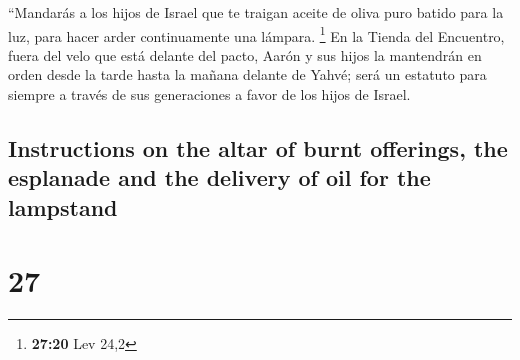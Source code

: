 \begin{paracol}{2}
 ``Mandarás a los hijos de Israel que te traigan aceite
de oliva puro batido para la luz, para hacer arder continuamente una
lámpara. \footnote{\textbf{27:20} Lev 24,2}  En la Tienda
del Encuentro, fuera del velo que está delante del pacto, Aarón y sus
hijos la mantendrán en orden desde la tarde hasta la mañana delante de
Yahvé; será un estatuto para siempre a través de sus generaciones a
favor de los hijos de Israel.

\switchcolumn
\begin{otherlanguage}{english}

\hypertarget{instructions-on-the-altar-of-burnt-offerings-the-esplanade-and-the-delivery-of-oil-for-the-lampstand}{%
\subsection{Instructions on the altar of burnt offerings, the esplanade
and the delivery of oil for the
lampstand}\label{instructions-on-the-altar-of-burnt-offerings-the-esplanade-and-the-delivery-of-oil-for-the-lampstand}}

\hypertarget{section-53}{%
\section{27}\label{section-53}}


\end{otherlanguage}
\end{paracol}
